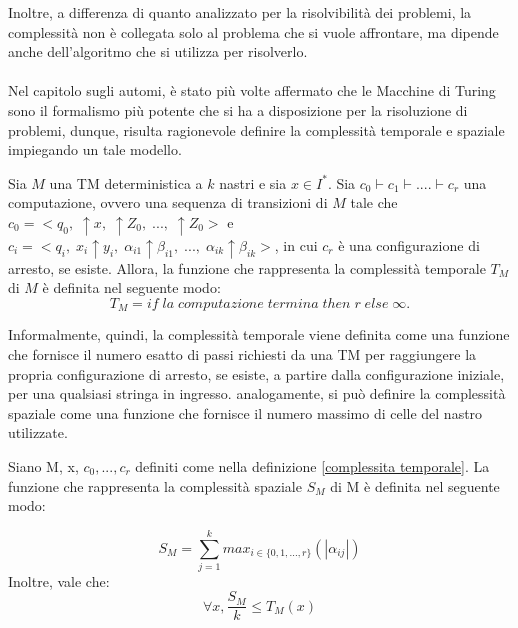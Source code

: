   Inoltre, a differenza di quanto analizzato per la risolvibilità dei problemi, la complessità non è collegata solo al problema che si vuole affrontare, ma dipende anche dell'algoritmo che si utilizza per risolverlo. 

  \paragraph{}
  Nel capitolo sugli automi, è stato più volte affermato che le Macchine di Turing sono il formalismo più potente che si ha a disposizione per la risoluzione di problemi, dunque, risulta ragionevole definire la complessità temporale e spaziale impiegando un tale modello.

  \begin{definition} \label{complessita temporale} 
    Sia \(M\) una TM deterministica a \(k\) nastri e sia \(x\in I^*\). Sia \(c_0\vdash c_1\vdash....\vdash c_r\) una computazione, ovvero una sequenza di transizioni di \(M\) tale che \(c_0=<q_0,\;\!\uparrow\! x,\; \!\uparrow\! Z_0,\; ...,\; \!\uparrow\! Z_0>\) e \\ \(c_i=<q_i,\;x_i\!\uparrow\! y_i,\; \alpha_{i1}\!\uparrow\! \beta_{i1},\; ...,\; \alpha_{ik}\!\uparrow\! \beta_{ik}>\), in cui \(c_r\) è una configurazione di arresto, se esiste. Allora, la funzione che rappresenta la complessità temporale \({T}_M\) di \(M\) è definita nel seguente modo:
    \begin{equation*}
      {T}_M=if\;la\;computazione\;termina\;then\;r\;else\;\infty.
    \end{equation*}
  \end{definition}

  Informalmente, quindi, la complessità temporale viene definita come una funzione che fornisce il numero esatto di passi richiesti da una TM per raggiungere la propria configurazione di arresto, se esiste, a partire dalla configurazione iniziale, per una qualsiasi stringa in ingresso. analogamente, si può definire la complessità spaziale come una funzione che fornisce il numero massimo di celle del nastro utilizzate.

  \begin{definition} \label{complessita spaziale}
    Siano M, x, \(c_0,...,c_r\) definiti come nella definizione \ref{complessita temporale}. La funzione che rappresenta la complessità spaziale \({S}_M\) di M è definita nel seguente modo:

    \begin{equation*}
      \displaystyle {S}_M=\sum_{j=1}^{k} max_{i\in\{0,1,...,r\}}(|\alpha_{ij}|)
    \end{equation*}
    Inoltre, vale che:
    \begin{equation*}
      \forall x, \frac{{S}_M}{k}\le {T}_M(x)
    \end{equation*}
  \end{definition}

